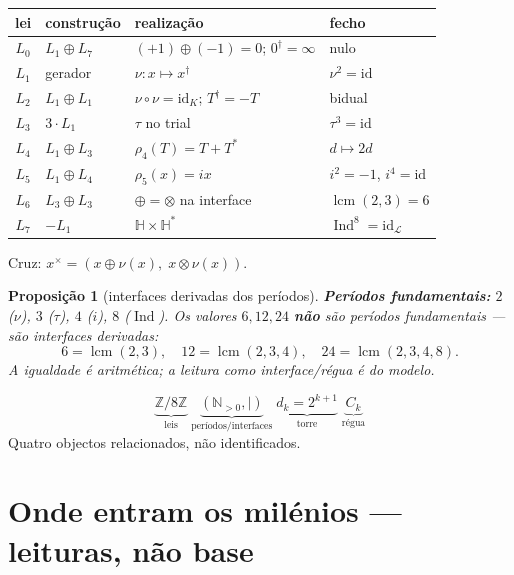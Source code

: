 \documentclass[11pt,a4paper]{article}
\newtheorem{proposicao}{Proposição}
\begin{document}
\begin{center}\small
\begin{tabular}{@{}clll@{}}
lei & construção & realização & fecho \\
\hline
$L_0$ & $L_1\oplus L_7$ & $(+1)\oplus(-1)=0$; $0^{\dagger}=\infty$ & nulo \\
$L_1$ & gerador & $\nu\colon x\mapsto x^{\dagger}$ & $\nu^{2}=\mathrm{id}$ \\
$L_2$ & $L_1\oplus L_1$ & $\nu\circ\nu=\mathrm{id}_K$; $T^{\dagger}=-T$ & bidual \\
$L_3$ & $3\cdot L_1$ & $\tau$ no trial & $\tau^{3}=\mathrm{id}$ \\
$L_4$ & $L_1\oplus L_3$ & $\rho_4(T)=T+T^{*}$ & $d\mapsto2d$ \\
$L_5$ & $L_1\oplus L_4$ & $\rho_5(x)=ix$ & $i^{2}=-1$, $i^{4}=\mathrm{id}$ \\
$L_6$ & $L_3\oplus L_3$ & $\oplus=\otimes$ na interface & $\operatorname{lcm}(2,3)=6$ \\
$L_7$ & $-L_1$ & $\mathbb{H}\times\mathbb{H}^{*}$ & $\operatorname{Ind}^{8}=\mathrm{id}_{\mathcal L}$ \\
\end{tabular}
\end{center}

Cruz: $x^{\times}=(x\oplus\nu(x),\;x\otimes\nu(x))$.

\begin{proposicao}[interfaces derivadas dos períodos]\label{thm:periodos}
\textbf{Períodos fundamentais:} $2$ ($\nu$), $3$ ($\tau$), $4$ ($i$),
$8$ ($\operatorname{Ind}$). Os valores $6,12,24$ \textbf{não} são
períodos fundamentais --- são \emph{interfaces derivadas}:
\[
6=\operatorname{lcm}(2,3),\quad
12=\operatorname{lcm}(2,3,4),\quad
24=\operatorname{lcm}(2,3,4,8).
\]
A igualdade é aritmética; a leitura como interface/régua é do modelo.
\end{proposicao}

\[
\boxed{
\underbrace{\mathbb{Z}/8\mathbb{Z}}_{\text{leis}}
\;
\underbrace{(\mathbb{N}_{>0},\mid)}_{\text{períodos/interfaces}}
\;
\underbrace{d_k=2^{k+1}}_{\text{torre}}
\;
\underbrace{C_k}_{\text{régua}}
}
\]
Quatro objectos relacionados, não identificados.

\section{Onde entram os milénios --- leituras, não base}\label{sec:milenio-leitura}
\end{document}
